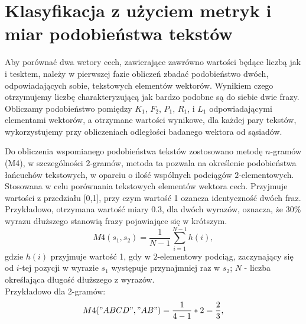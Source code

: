 \documentclass{classrep}
\begin{document}
\section{Klasyfikacja z użyciem metryk i miar podobieństwa tekstów}

Aby porównać dwa wetory cech, zawierające zawrówno wartości będące liczbą jak i tesktem, należy w pierwszej fazie obliczeń zbadać podobieństwo dwóch, odpowiadających sobie,
tekstowych elementów wektorów. Wynikiem czego otrzymujemy liczbę charakteryzującą jak bardzo podobne są do siebie dwie frazy. 
Obliczamy
podobieństwo pomiędzy $K_1$, $F_2$, $P_1$, $R_1$, i $L_1$ odpowiadającymi elementami wektorów, a otrzymane wartości wynikowe, dla każdej pary tekstów, wykorzystujemy 
przy obliczeniach odległości badanego wektora od sąsiadów. %

Do obliczenia wspomianego podobieństwa tekstów zostosowano metodę \(n\)-gramów (M4), w szczególności \(2\)-gramów, metoda ta pozwala na określenie podobieństwa łańcuchów tekstowych, w oparciu o ilość wspólnych podciągów \(2\)-elementowych. Stosowana w celu porównania tekstowych elementów wektora cech. 
Przyjmuje wartości z przedziału [0,1], przy czym wartość 1 ozancza identyczność dwóch fraz. Przykładowo, otrzymana wartość miary 0.3, dla dwóch wyrazów, oznacza, że 30\% wyrazu dłuższego stanowią frazy pojawiające się w krótszym. 
    \begin{equation}
      M4(s_1, s_2) = \frac{1}{N-1} \sum_{i=1}^{N-1} h(i),
    \end{equation}
  gdzie \(h(i)\) przyjmuje wartość 1, gdy w \(2\)-elementowy podciąg, zaczynający się od \(i\)-tej pozycji w wyrazie \(s_1\) występuje przynajmniej raz w \(s_2\);
  \(N\) - liczba określająca długość dłuższego z wyrazów.\\ Przykładowo dla 2-gramów:
\begin{equation}
      M4("ABCD", "AB") = \frac{1}{4-1} * 2 = \frac{2}{3},
\end{equation}

\end{document}
